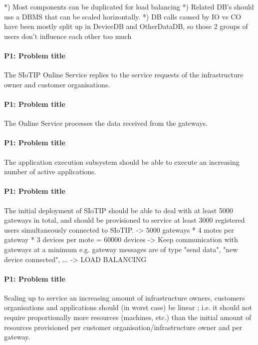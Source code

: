     *) Most components can be duplicated for load balancing
    *) Related DB's should use a DBMS that can be scaled horizontally.
    *) DB calls caused by IO vs CO have been mostly split up in DeviceDB and OtherDataDB, so those 2 groups of
       users don't influence each other too much


    \paragraph{P1: Problem title}
        The SIoTIP Online Service replies to the service requests of the
        infrastructure owner and customer organisations.

    \paragraph{P1: Problem title}
        The Online Service processes the data received from the gateways.

    \paragraph{P1: Problem title}
        The application execution subsystem should be able to execute an increasing
        number of active applications.

    \paragraph{P1: Problem title}
        The initial deployment of SIoTIP should be able to deal with at least 5000
        gateways in total, and should be provisioned to service at least 3000
        registered users simultaneously connected to SIoTIP.
        -> 5000 gateways * 4 motes per gateway * 3 devices per mote = 60000 devices
        -> Keep communication with gateways at a minimum
           e.g. gateway messages are of type "send data", "new device connected", ...
        -> LOAD BALANCING

    \paragraph{P1: Problem title}
        Scaling up to service an increasing amount of infrastructure owners,
        customers organisations and applications should (in worst case) be linear ;
        i.e. it should not require proportionally more resources (machines, etc.)
        than the initial amount of resources provisioned per customer
        organisation/infrastructure owner and per gateway.


